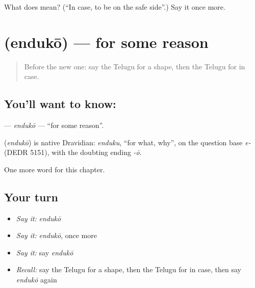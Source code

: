 \begin{tcolorbox}[breakable,colback=teal!4,colframe=teal!35!black,title={Before you move on}]
What does  mean? (\textquotedblleft{}In case, to be on the safe side\textquotedblright{}.) Say it once more.
\end{tcolorbox}
\section[\texorpdfstring{\te{ఎందుకో} (endukō)}{ఎందుకో (endukō)}]{ (endukō) — for some reason}

\label{lesson:TE-C295-enduko}



\begin{quote}
Before the new one: say the Telugu for a shape, then the Telugu for in case.
\end{quote}

\subsection*{You'll want to know: }
\textbf{} — \emph{endukō} — \textquotedblleft{}for some reason\textquotedblright{}.

\begin{cousinweb}
\textbf{} (\emph{endukō}) is native Dravidian: \emph{enduku}, \textquotedblleft{}for what, why\textquotedblright{}, on the question base \emph{e-} (DEDR 5151), with the doubting ending \emph{-ō}.
\end{cousinweb}

\begin{grammarlens}[title={What you've built}]
One more word for this chapter.
\end{grammarlens}

\subsection*{Your turn}
\begin{itemize}
\raggedright
  \item \emph{Say it:} \emph{endukō}
  \item \emph{Say it:} \emph{endukō}, once more
  \item \emph{Say it:} say \emph{endukō}
  \item \emph{Recall:} say the Telugu for a shape, then the Telugu for in case, then say \emph{endukō} again
\end{itemize}

